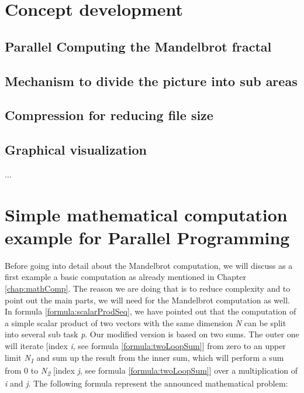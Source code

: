 \section{Concept development}

\subsection{Parallel Computing the Mandelbrot fractal}

\subsection{Mechanism to divide the picture into sub areas}

\subsection{Compression for reducing file size}

\subsection{Graphical visualization}

...\newpage

\section{Simple mathematical computation example for Parallel Programming} \label{chap:simpleMathCompParallel}

Before going into detail about the Mandelbrot computation, we will discuss as a first example a basic computation as already mentioned in Chapter \ref{chap:mathComp}. The reason we are doing that is to reduce complexity and to point out the main parts, we will need for the Mandelbrot computation as well. In formula \ref{formula:scalarProdSeq}, we have pointed out that the computation of a simple scalar product of two vectors with the same dimension \textit{N} can be split into several sub task \textit{p}. Our modified version is based on two sums. The outer one will iterate [index \textit{i}, see formula \ref{formula:twoLoopSum}] from zero to an upper limit \textit{N\textsubscript{1}} and sum up the result from the inner sum, which will perform a sum from 0 to \textit{N\textsubscript{2}} [index \textit{j}, see formula \ref{formula:twoLoopSum}] over a multiplication of \textit{i} and \textit{j}. The following formula represent the announced mathematical problem:

